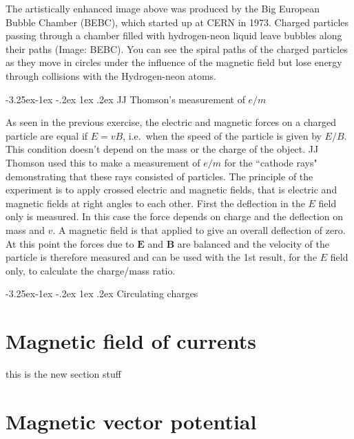 \documentclass[
]{book}
\makeatletter
\renewcommand\subsection{%
\@startsection{subsection}{2}{\z@}%
              {-3.25ex\@plus -1ex \@minus -.2ex}%
              {1ex \@plus .2ex}%
              {\sffamily\bfseries}}
\makeatother
\begin{document}
The artistically enhanced image above was produced by the Big European
Bubble Chamber (BEBC), which started up at CERN in 1973. Charged
particles passing through a chamber filled with hydrogen-neon liquid
leave bubbles along their paths (Image: BEBC). You can see the spiral
paths of the charged particles as they move in circles under the
influence of the magnetic field but lose energy through collisions with
the Hydrogen-neon atoms.

\hypertarget{jj-thomsons-measurement-of-em}{%
\subsection{\texorpdfstring{JJ Thomson's measurement of \(e/m\)}{JJ Thomson's measurement of e/m}}\label{jj-thomsons-measurement-of-em}}

As seen in the previous exercise, the electric and magnetic forces on a
charged particle are equal if \(E = vB\), i.e.~when the speed of the
particle is given by \(E/B\). This condition doesn't depend on the mass or
the charge of the object. JJ Thomson used this to make a measurement of
\(e/m\) for the ``cathode rays" demonstrating that these rays consisted of
particles. The principle of the experiment is to apply crossed electric
and magnetic fields, that is electric and magnetic fields at right
angles to each other. First the deflection in the \(E\) field only is
measured. In this case the force depends on charge and the deflection on
mass and \(v\). A magnetic field is that applied to give an overall
deflection of zero. At this point the forces due to \(\mathbf{E}\) and \(\mathbf{B}\) are
balanced and the velocity of the particle is therefore measured and can
be used with the 1st result, for the \(E\) field only, to calculate the
charge/mass ratio.

\hypertarget{circulating-charges}{%
\subsection{Circulating charges}\label{circulating-charges}}

\hypertarget{magnetic-field-of-currents}{%
\chapter{Magnetic field of currents}\label{magnetic-field-of-currents}}

this is the new section stuff

\hypertarget{magnetic-vector-potential}{%
\chapter{Magnetic vector potential}\label{magnetic-vector-potential}}
\end{document}
